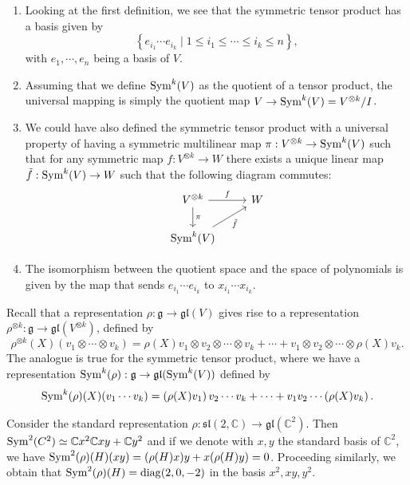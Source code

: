 \documentclass{report}
\begin{document}
\begin{remark}
    \begin{enumerate}[label = (\roman*)]
        \item Looking at the first definition, we see that the symmetric tensor product has a basis given by
        \[
        \left\{ e_{i_1} \cdots e_{i_k} \mid 1 \leq i_1 \leq \cdots \leq i_k \leq n \right\},
        \]
        with $e_1, \cdots, e_n$ being a basis of $V$.
        \item Assuming that we define $\operatorname{Sym}^k(V)$ as the quotient of a tensor product, the universal mapping is simply the quotient map $V \to \operatorname{Sym}^k(V) = V^{\otimes k}/I$.
        \item We could have also defined the symmetric tensor product with a universal property of having a symmetric multilinear map $\pi: V^{\otimes k} \to \operatorname{Sym}^k(V)$ such that for any symmetric map $f: V^{\otimes k} \to W$ there exists a unique linear map $\tilde f: \operatorname{Sym}^k(V) \to W$ such that the following diagram commutes:
        \[
        \begin{tikzcd}
            V^{\otimes k} \arrow[r, "f"] \arrow[d, "\pi"] & W \\
            \Sym^k(V) \arrow[ur, "\tilde f"']
        \end{tikzcd}
        \]
        \item The isomorphism between the quotient space and the space of polynomials is given by the map that sends $e_{i_1} \cdots e_{i_k}$ to $x_{i_1} \cdots x_{i_k}$.
    \end{enumerate}
    
    Recall that a representation $\rho: \mathfrak g \to \mathfrak{gl}(V)$ gives rise to a representation $\rho^{\otimes k}: \mathfrak g \to \mathfrak{gl}(V^{\otimes k})$, defined by
    \[
    \rho^{\otimes k}(X)(v_1 \otimes \cdots \otimes v_k) = \rho(X)v_1 \otimes v_2 \otimes \cdots \otimes v_k + \cdots + v_1 \otimes v_2 \otimes \cdots \otimes \rho(X)v_k.
    \]
    The analogue is true for the symmetric tensor product, where we have a representation $\operatorname{Sym}^k(\rho): \mathfrak g \to \mathfrak{gl}(\operatorname{Sym}^k(V))$ defined by
    \[
    \operatorname{Sym}^k(\rho)(X)(v_1 \cdots v_k) = \left(\rho(X)v_1\right) v_2 \cdots v_k + \cdots + v_1 v_2 \cdots \left(\rho(X)v_k\right).
    \]
\end{remark}

\begin{example}
    Consider the standard representation $\rho: \mathfrak{sl}(2, \mathbb C) \to \mathfrak{gl}(\mathbb C^2)$.
    Then $\operatorname{Sym}^2(C^2) \simeq \mathbb C x^2 \mathbb C xy + \mathbb C y^2 $ and if we denote with $x,y$ the standard basis of $\mathbb C^2$, we have $\operatorname{Sym}^2(\rho)(H)(x y) = (\rho(H)x)y + x (\rho(H)y) = 0$.
    Proceeding similarly, we obtain that $\operatorname{Sym}^2(\rho)(H) = \operatorname{diag}(2, 0, -2)$ in the basis $x^2, xy, y^2$. 
\end{example}
\end{document}
